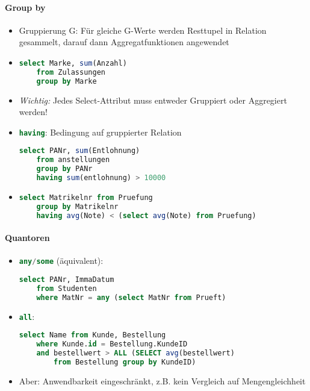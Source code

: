 \paragraph{Group by}
\begin{itemize}
	\item Gruppierung G: Für gleiche G-Werte werden Resttupel in Relation gesammelt, darauf dann Aggregatfunktionen angewendet
	\item
	\begin{lstlisting}[language=sql]
select Marke, sum(Anzahl)
	from Zulassungen
	group by Marke
	\end{lstlisting}
	\item \emph{Wichtig:} Jedes Select-Attribut muss entweder Gruppiert oder Aggregiert werden!
	\item \lstinline[language=sql]{having}: Bedingung auf gruppierter Relation
	\begin{lstlisting}[language=sql]
select PANr, sum(Entlohnung)
	from anstellungen
	group by PANr
	having sum(entlohnung) > 10000
	\end{lstlisting}
	
	\item
	\begin{lstlisting}[language=sql]
select Matrikelnr from Pruefung
	group by Matrikelnr
	having avg(Note) < (select avg(Note) from Pruefung)
	\end{lstlisting}
\end{itemize}



\paragraph{Quantoren}
\begin{itemize}
	\item \lstinline[language=sql]{any/some} (äquivalent):
	\begin{lstlisting}[language=sql]
select PANr, ImmaDatum
	from Studenten
	where MatNr = any (select MatNr from Prueft)
	\end{lstlisting}
	\item \lstinline[language=sql]{all}:
	\begin{lstlisting}[language=sql]
select Name from Kunde, Bestellung
	where Kunde.id = Bestellung.KundeID
	and bestellwert > ALL (SELECT avg(bestellwert) 
		from Bestellung group by KundeID)
	\end{lstlisting}
	\item Aber: Anwendbarkeit eingeschränkt, z.B. kein Vergleich auf Mengengleichheit
\end{itemize}

